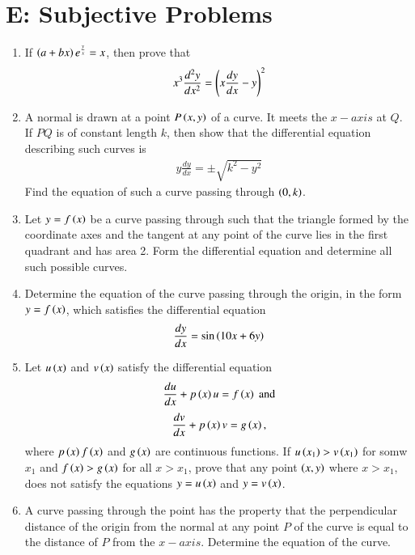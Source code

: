 \documentclass[journal,12pt,twocolumn,article]{IEEEtran}
\theoremstyle{remark}
\begin{document}
\section*{E: Subjective Problems}
\begin{enumerate}
\item If $\left(a+bx\right)e^{\frac{y}{x}}=x$, then prove that 
\begin{align*}
x^3\frac{d^2y}{dx^2}=\left(x\frac{dy}{dx}-y\right)^2
\end{align*}
\hfill{}
\item A normal is drawn at a point $P\left(x,y\right)$ of a curve. It meets the $x-axis$ at $Q$. If $PQ$ is of constant length $k$, then show that the differential equation describing such curves is
\begin{align*}
y\frac{dy}{dx}=\pm \sqrt{k^2-y^2}
\end{align*}
Find the equation of such a curve passing through $\left(0,k\right)$.
\hfill{}
\item Let $y=f\left(x\right)$ be a curve passing through  such that the triangle formed by the coordinate axes and the tangent at any point of the curve lies in the first quadrant and has area 2. Form the differential equation and determine all such possible curves.
\hfill{}
\item Determine the equation of the curve passing through the origin, in the form $y=f\left(x\right)$, which satisfies the differential equation 
\begin{align*}
\frac{dy}{dx}=\sin\left(10x+6y\right)
\end{align*}
\hfill{}
\item Let $u\left(x\right)$ and $v\left(x\right)$ satisfy the differential equation 
\begin{align*}
\frac{du}{dx}+p\left(x\right)u=f\left(x\right) \;\text{and}
\end{align*} 
\begin{align*}
\frac{dv}{dx}+p\left(x\right)v=g\left(x\right),
\end{align*} where $p\left(x\right) f\left(x\right)$ and $g\left(x\right)$ are continuous functions. If $u\left(x_1\right)>v\left(x_1\right)$ for somw $x_1$ and $f\left(x\right)>g\left(x\right)$ for all $x>x_1$, prove that any point $\left(x,y\right)$ where $x>x_1$, does not satisfy the equations $y=u\left(x\right)$ and $y=v\left(x\right)$.
\hfill{}
\item A curve passing through the point  has the property that the perpendicular distance of the origin from the normal at any point $P$ of the curve is equal to the distance of $P$ from the $x-axis$. Determine the equation of the curve.

\end{enumerate}
\end{document}
